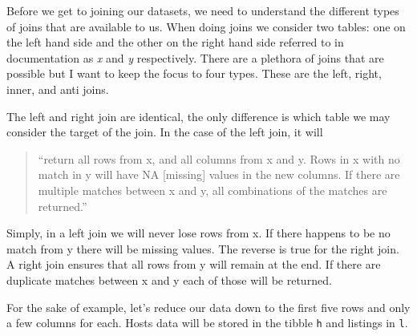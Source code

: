 \documentclass[
]{book}
\begin{document}
Before we get to joining our datasets, we need to understand the different types of joins that are available to us. When doing joins we consider two tables: one on the left hand side and the other on the right hand side referred to in documentation as \emph{x} and \emph{y} respectively. There are a plethora of joins that are possible but I want to keep the focus to four types. These are the left, right, inner, and anti joins.

The left and right join are identical, the only difference is which table we may consider the target of the join. In the case of the left join, it will

\begin{quote}
``return all rows from x, and all columns from x and y. Rows in x with no match in y will have NA {[}missing{]} values in the new columns. If there are multiple matches between x and y, all combinations of the matches are returned.''
\end{quote}

Simply, in a left join we will never lose rows from x. If there happens to be no match from y there will be missing values. The reverse is true for the right join. A right join ensures that all rows from y will remain at the end. If there are duplicate matches between x and y each of those will be returned.

For the sake of example, let's reduce our data down to the first five rows and only a few columns for each. Hosts data will be stored in the tibble \texttt{h} and listings in \texttt{l}.
\end{document}
